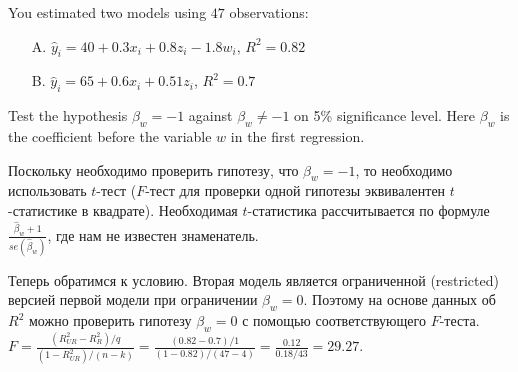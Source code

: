 \documentclass[addpoints, answers]{exam} %
\begin{document}
\begin{questions}


\question[10]

You estimated two models using $47$ observations:

\begin{enumerate}
\item[A.]  $\hat y_i=40+0.3x_i+0.8z_i-1.8w_i$, $R^2=0.82$

\item[B.]  $\hat y_i=65+0.6x_i+0.51z_i$, $R^2=0.7$
\end{enumerate}

Test the hypothesis $\beta_w=-1$ against $\beta_w \ne -1$ on 5\% significance level. Here $\beta_w$ is the coefficient before the variable $w$  in the first regression.

\begin{solution}

Поскольку необходимо проверить гипотезу, что $\beta_w=-1$, то необходимо использовать $t$-тест ($F$-тест для проверки одной гипотезы эквивалентен $t$-статистике в квадрате). Необходимая $t$-статистика рассчитывается по формуле $\frac{\hat{\beta}_{w} +1}{se(\hat{\beta }_{w} )}$, где нам не известен знаменатель.

Теперь обратимся к условию. Вторая модель является ограниченной (restricted) версией первой модели при ограничении $\beta_w=0$. Поэтому на основе данных об $R^2$ можно проверить гипотезу $\beta_w=0$ с помощью соответствующего $F$-теста. $F=\frac{(R_{UR}^{2} -R_{R}^{2} )/q}{(1-R_{UR}^{2} )/(n-k)} =\frac{(0.82-0.7)/1}{(1-0.82)/(47-4)} =\frac{0.12}{0.18/43} =29.27$.


\end{solution}
\end{questions}
\end{document}
